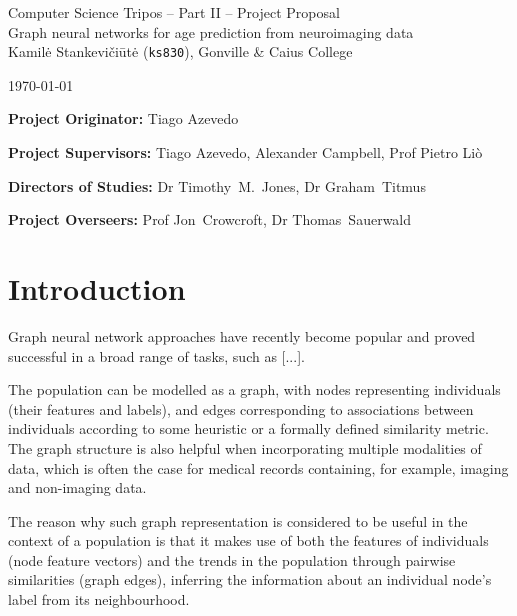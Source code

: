 \documentclass[12pt,a4paper,twoside]{article}
\begin{document}
\begin{center}
\Large
Computer Science Tripos -- Part II -- Project Proposal\\[4mm]
\LARGE
Graph neural networks for age prediction from neuroimaging data \\[4mm]

\large
Kamilė Stankevičiūtė (\texttt{ks830}), Gonville \& Caius College

\today %
\end{center}

\vspace{5mm}
\textbf{Project Originator:} Tiago Azevedo

\textbf{Project Supervisors:} Tiago Azevedo, Alexander Campbell, Prof Pietro Liò

\textbf{Directors of Studies:} Dr Timothy~M.~Jones, Dr Graham~Titmus

\textbf{Project Overseers:} Prof Jon~Crowcroft, Dr Thomas~Sauerwald


\section*{Introduction}


Graph neural network approaches have recently become popular and  proved successful in a broad range of tasks, such as [...]. 

The population can be modelled as a graph, with nodes representing individuals (their features and labels), and edges corresponding to associations between individuals according to some heuristic or a formally defined similarity metric. The graph structure is also helpful when incorporating multiple modalities of data, which is often the case for medical records containing, for example, imaging and non-imaging data. 

The reason why such graph representation is considered to be useful in the context of a population is that it makes use of both the features of individuals (node feature vectors) and the trends in the population through pairwise similarities (graph edges), inferring the information about an individual node's label from its neighbourhood.
\end{document}
